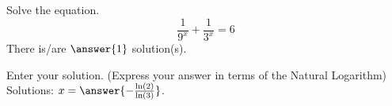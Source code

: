 \documentclass{ximera}
\author{Bobby Ramsey}
\begin{document}
\begin{exercise}
	Solve the equation.
	\[ \frac{1}{9^x} + \frac{1}{3^x} = 6 \]
	There is/are $\answer{1}$ solution(s).
	\begin{exercise}
		Enter your solution. (Express your answer in terms of the Natural Logarithm)
		Solutions: $x = \answer{ -\frac{\ln(2)}{\ln(3)} }$.
	\end{exercise}
\end{exercise}
\end{document}
